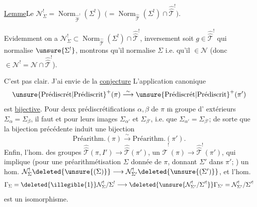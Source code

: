 \uline{Lemme}\quad Le
$\mathcal N^{!}_{\Sigma}=\operatorname{Norm}_{\widehat{\widehat{\mathcal T}}^{!}}(\Sigma^{!})$
$\bigl(=\operatorname{Norm}_{\widehat{\widehat{\mathcal T}}}(\Sigma^{!})\cap
\widehat{\widehat{\mathcal T}}^{!}\bigr)$.


Evidemment on a
$\mathcal N^{!}_{\Sigma}\subset
\operatorname{Norm}_{\widehat{\widehat{\mathcal T}}}(\Sigma^{!})\cap
\widehat{\widehat{\mathcal T}}^{!}$,
inversement soit $g\in\widehat{\widehat{\mathcal T}}^{!}$ qui normalise
$\unsure{\Sigma^{!}}$, montrons qu'il normalise $\Sigma$ i.e.
qu'il  $\in\mathcal N$
(donc $\in\mathcal N^{!}=\mathcal N\cap\widehat{\widehat{\mathcal T}}^{!}$).

C'est pas clair. J'ai  envie de   la
\uline{conjecture} L'application canonique
\[
\unsure{\text{Prédiscrét}|\text{Prédiscrit}}^{+}(\pi)
 \overset{\sim}{\longrightarrow}
\unsure{\text{Prédiscrét}|\text{Prédiscrit}}^{+}(\pi')
\]
est \uline{bijective}. Pour  deux prédiscrétifications 
$\alpha,\beta$ de $\pi$   $\overline{\mathrm m}$ groupe d' extérieurs
$\Sigma_\alpha=\Sigma_\beta$,  il faut et 
 
pour leurs images $\Sigma_{\alpha'}$ et $\Sigma_{\beta'}$, i.e. que
$\Sigma_{\alpha'}=\Sigma_{\beta'}$; de sorte que la bijection précédente induit une bijection
\[
\text{Préarithm.}(\pi)\overset{\sim}{\longrightarrow}\text{Préarithm.}(\pi').
\]
Enfin, 
l'hom. des groupes 
$\widehat{\widehat{\mathcal T}}(\pi,I')\longrightarrow\widehat{\widehat{\mathcal T}}(\pi')$,
 
un $\widehat{\widehat{\mathcal T}}^{!}(\pi)\longrightarrow\widehat{\widehat{\mathcal T}}^{!}(\pi')$,
 qui implique 
(pour une préarithmétisation $\Sigma$ 
donnée de $\pi$, donnant $\Sigma'$ 
dans $\pi'$; ) un
hom.
$\mathcal N_\Sigma^{!}\deleted{\unsure{(\Sigma)}}\longrightarrow
\mathcal N_{\Sigma'}^{!}\deleted{\unsure{(\Sigma')}}$,
 et l'hom. 
\[
\Gamma_\Sigma=\deleted{\illegible{1}}\mathcal N_\Sigma^{!}/\Sigma^{!}
 \longrightarrow
\deleted{\unsure{\mathcal N_{\Sigma'}^{!}/\Sigma'^{!}}}\Gamma_{\Sigma'}=\mathcal N_{\Sigma'}^{!}/\Sigma'^{!}
\]
est un isomorphisme.

